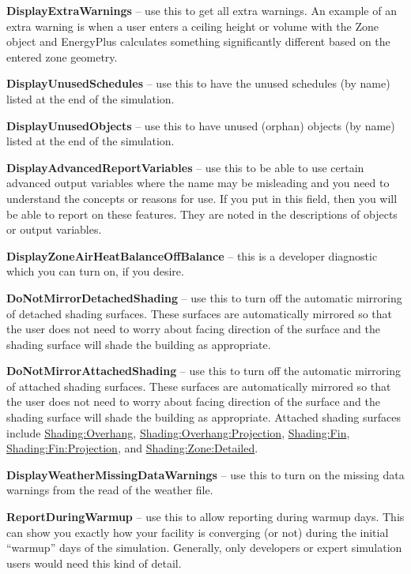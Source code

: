 \textbf{DisplayExtraWarnings} -- use this to get all extra warnings. An example of an extra warning is when a user enters a ceiling height or volume with the Zone object and EnergyPlus calculates something significantly different based on the entered zone geometry.

\textbf{DisplayUnusedSchedules} -- use this to have the unused schedules (by name) listed at the end of the simulation.

\textbf{DisplayUnusedObjects} -- use this to have unused (orphan) objects (by name) listed at the end of the simulation.

\textbf{DisplayAdvancedReportVariables} -- use this to be able to use certain advanced output variables where the name may be misleading and you need to understand the concepts or reasons for use. If you put in this field, then you will be able to report on these features. They are noted in the descriptions of objects or output variables.

\textbf{DisplayZoneAirHeatBalanceOffBalance} -- this is a developer diagnostic which you can turn on, if you desire.

\textbf{DoNotMirrorDetachedShading} -- use this to turn off the automatic mirroring of detached shading surfaces. These surfaces are automatically mirrored so that the user does not need to worry about facing direction of the surface and the shading surface will shade the building as appropriate.

\textbf{DoNotMirrorAttachedShading} -- use this to turn off the automatic mirroring of attached shading surfaces. These surfaces are automatically mirrored so that the user does not need to worry about facing direction of the surface and the shading surface will shade the building as appropriate. Attached shading surfaces include \hyperref[shadingoverhang]{Shading:Overhang}, \hyperref[shadingoverhangprojection]{Shading:Overhang:Projection}, \hyperref[shadingfin]{Shading:Fin}, \hyperref[shadingfinprojection]{Shading:Fin:Projection}, and \hyperref[shadingzonedetailed-000]{Shading:Zone:Detailed}.

\textbf{DisplayWeatherMissingDataWarnings} -- use this to turn on the missing data warnings from the read of the weather file.

\textbf{ReportDuringWarmup} -- use this to allow reporting during warmup days. This can show you exactly how your facility is converging (or not) during the initial ``warmup'' days of the simulation. Generally, only developers or expert simulation users would need this kind of detail.

